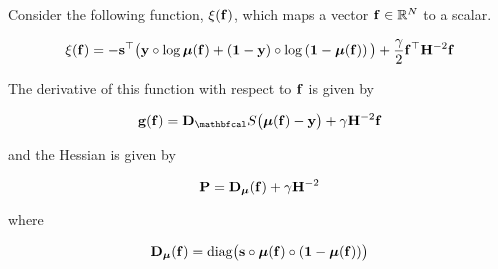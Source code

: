 \begin{theorem}
    \label{the:gradient_and_hesian}

    Consider the following function, $\xi(\mathbf{f})$, which maps a vector $\mathbf{f} \in \mathbb{R}^N$ to a scalar. 

    \begin{equation}
        \xi(\mathbf{f}) = -\mathbf{s}^\top \big(\mathbf{y} \circ \log \boldsymbol{\mu}(\mathbf{f}) + \left(\mathbf{1}  - \mathbf{y}\right) \circ \log \left(\mathbf{1} - \boldsymbol{\mu}(\mathbf{f}) \right)\big) + \frac{\gamma}{2} \mathbf{f}^\top \mathbf{H}^{-2} \mathbf{f}
    \end{equation}

    The derivative of this function with respect to $\mathbf{f}$ is given by 

    \begin{equation}
        \g(\f) = \D_\St \big(\muu(\f) - \y\big) + \gamma \HH^{-2} \f
    \end{equation}

    and the Hessian is given by 

    \begin{equation}
        \mathbf{P}  =  \mathbf{D}_{\boldsymbol{\mu}}(\mathbf{f}) + \gamma \mathbf{H}^{-2}
    \end{equation}

    where 

    \begin{equation*}
        \mathbf{D}_{\boldsymbol{\mu}}(\mathbf{f}) = \textup{diag}\big(\mathbf{s} \circ \boldsymbol{\mu}(\mathbf{f}) \circ (\mathbf{1} - \boldsymbol{\mu}(\mathbf{f}))\big)
    \end{equation*}

\end{theorem}

